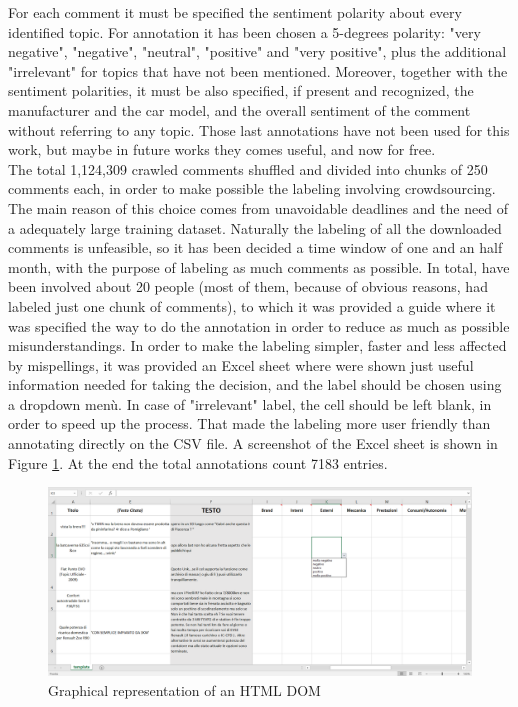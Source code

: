 For each comment it must be specified the sentiment polarity about every identified topic. For annotation it has been chosen a 5-degrees polarity: "very negative", "negative", "neutral", "positive" and "very positive", plus the additional "irrelevant" for topics that have not been mentioned. Moreover, together with the sentiment polarities, it must be also specified, if present and recognized, the manufacturer and the car model, and the overall sentiment of the comment without referring to any topic. Those last annotations have not been used for this work, but maybe in future works they comes useful, and now for free.\\
The total 1,124,309 crawled comments shuffled and divided into chunks of 250 comments each, in order to make possible the labeling involving crowdsourcing. The main reason of this choice comes from unavoidable deadlines and the need of a adequately large training dataset. Naturally the labeling of all the downloaded comments is unfeasible, so it has been decided a time window of one and an half month, with the purpose of labeling as much comments as possible. In total, have been involved about 20 people (most of them, because of obvious reasons, had labeled just one chunk of comments), to which it was provided a guide where it was specified the way to do the annotation in order to reduce as much as possible misunderstandings. In order to make the labeling simpler, faster and less affected by mispellings, it was provided an Excel sheet where were shown just useful information needed for taking the decision, and the label should be chosen using a dropdown menù. In case of "irrelevant" label, the cell should be left blank, in order to speed up the process. That made the labeling more user friendly than annotating directly on the CSV file. A screenshot of the Excel sheet is shown in Figure \ref{fig:excel-sheet}. At the end the total annotations count 7183 entries.\\


\begin{figure}[ht]
	\centering
	\includegraphics[width=1\textwidth]{figures/screen/excel-sheet.png}
	\caption{Graphical representation of an HTML DOM}
	\label{fig:excel-sheet}
\end{figure}


